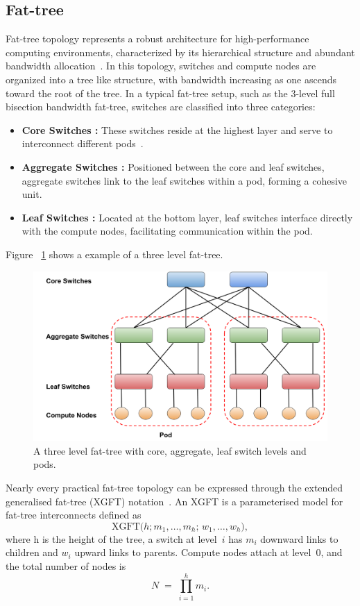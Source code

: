 \subsection{Fat-tree} Fat-tree topology represents a robust architecture for
high-performance computing environments, characterized by its hierarchical
structure and abundant bandwidth allocation~\cite{leiserson1985fat}. In this topology, switches and
compute nodes are organized into a tree like structure, with bandwidth
increasing as one ascends toward the root of the tree. In a typical fat-tree setup, such as the 3-level full bisection bandwidth
fat-tree, switches are classified into three categories: 

\begin{itemize} 
\item \textbf{Core Switches :} These switches reside at the highest layer and serve to interconnect different pods~\cite{al2008scalable}.
\item \textbf{Aggregate Switches :} Positioned between the core and leaf switches, aggregate switches link to the leaf switches within a pod, forming a cohesive unit.
\item \textbf{Leaf Switches :} Located at the bottom layer, leaf switches interface directly with the compute nodes, facilitating communication within the pod.
\end{itemize} 
Figure ~\ref{fig:ftree_ex} shows a example of a three level fat-tree.
\begin{figure}[h!]
  \centering
  \includegraphics[width=0.8\columnwidth]{./figs/ftree_ex.png}
  \caption{A three level fat-tree with core, aggregate, leaf switch levels and pods.}
  \label{fig:ftree_ex}
\end{figure} 


Nearly every practical fat-tree topology can be expressed through the extended generalised fat-tree (XGFT) notation~\cite{nienaber2014effective}. An XGFT is a parameterised model for fat-tree interconnects defined as
\[
\mathrm{XGFT}\!\bigl(h; m_{1},\ldots,m_{h};\, w_{1},\ldots,w_{h}\bigr),
\]
where h is the height of the tree, a switch at level~$i$ has \(m_{i}\) downward links to children and \(w_{i}\) upward links to parents. Compute nodes attach at level~0, and the total number of nodes is
\[
N \;=\; \prod_{i=1}^{h} m_{i}.
\]


